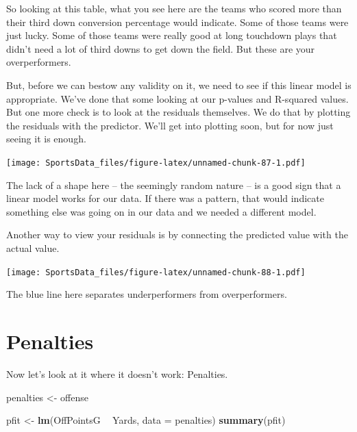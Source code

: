 \documentclass[]{book}
\newenvironment{Shaded}{\begin{snugshade}}{\end{snugshade}}
\newcommand{\KeywordTok}[1]{\textcolor[rgb]{0.13,0.29,0.53}{\textbf{#1}}}
\newcommand{\DataTypeTok}[1]{\textcolor[rgb]{0.13,0.29,0.53}{#1}}
\newcommand{\StringTok}[1]{\textcolor[rgb]{0.31,0.60,0.02}{#1}}
\newcommand{\OperatorTok}[1]{\textcolor[rgb]{0.81,0.36,0.00}{\textbf{#1}}}
\newcommand{\NormalTok}[1]{#1}
\begin{document}
So looking at this table, what you see here are the teams who scored
more than their third down conversion percentage would indicate. Some of
those teams were just lucky. Some of those teams were really good at
long touchdown plays that didn't need a lot of third downs to get down
the field. But these are your overperformers.

But, before we can bestow any validity on it, we need to see if this
linear model is appropriate. We've done that some looking at our
p-values and R-squared values. But one more check is to look at the
residuals themselves. We do that by plotting the residuals with the
predictor. We'll get into plotting soon, but for now just seeing it is
enough.

\texttt{[image: SportsData\_files/figure-latex/unnamed-chunk-87-1.pdf]}

The lack of a shape here -- the seemingly random nature -- is a good
sign that a linear model works for our data. If there was a pattern,
that would indicate something else was going on in our data and we
needed a different model.

Another way to view your residuals is by connecting the predicted value
with the actual value.

\texttt{[image: SportsData\_files/figure-latex/unnamed-chunk-88-1.pdf]}

The blue line here separates underperformers from overperformers.

\section{Penalties}\label{penalties}

Now let's look at it where it doesn't work: Penalties.

\begin{Shaded}
\begin{Highlighting}[]
\NormalTok{penalties <-}\StringTok{ }\NormalTok{offense}
\end{Highlighting}
\end{Shaded}

\begin{Shaded}
\begin{Highlighting}[]
\NormalTok{pfit <-}\StringTok{ }\KeywordTok{lm}\NormalTok{(OffPointsG }\OperatorTok{~}\StringTok{ }\NormalTok{Yards, }\DataTypeTok{data =}\NormalTok{ penalties)}
\KeywordTok{summary}\NormalTok{(pfit)}
\end{Highlighting}
\end{Shaded}
\end{document}
